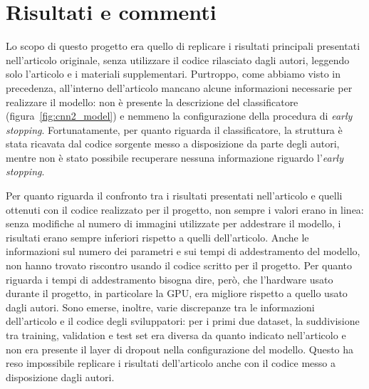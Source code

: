 \documentclass[italian,12pt,a4paper,oneside,final]{report}
\begin{document}
\newpage
\section{Risultati e commenti}
Lo scopo di questo progetto era quello di replicare i risultati principali presentati nell'articolo originale, senza utilizzare il codice rilasciato dagli autori, leggendo solo l'articolo e i materiali supplementari.
Purtroppo, come abbiamo visto in precedenza, all'interno dell'articolo mancano alcune informazioni necessarie per realizzare il modello: non è presente la descrizione del classificatore (figura~\ref{fig:cnn2_model}) e nemmeno la configurazione della procedura di \textit{early stopping}.
Fortunatamente, per quanto riguarda il classificatore, la struttura è stata ricavata dal codice sorgente messo a disposizione da parte degli autori, mentre non è stato possibile recuperare nessuna informazione riguardo l'\textit{early stopping}.

Per quanto riguarda il confronto tra i risultati presentati nell'articolo e quelli ottenuti con il codice realizzato per il progetto, non sempre i valori erano in linea: senza modifiche al numero di immagini utilizzate per addestrare il modello, i risultati erano sempre inferiori rispetto a quelli dell'articolo.
Anche le informazioni sul numero dei parametri e sui tempi di addestramento del modello, non hanno trovato riscontro usando il codice scritto per il progetto.
Per quanto riguarda i tempi di addestramento bisogna dire, però, che l'hardware usato durante il progetto, in particolare la GPU, era migliore rispetto a quello usato dagli autori.
Sono emerse, inoltre, varie discrepanze tra le informazioni dell'articolo e il codice degli sviluppatori: per i primi due dataset, la suddivisione tra training, validation e test set era diversa da quanto indicato nell'articolo e non era presente il layer di dropout nella configurazione del modello.
Questo ha reso impossibile replicare i risultati dell'articolo anche con il codice messo a disposizione dagli autori.

\printbibliography[heading=bibintoc] %
\end{document}
